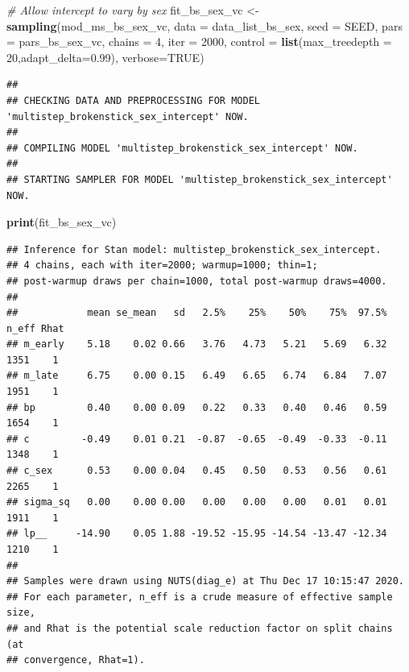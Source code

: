 \documentclass[
]{article}
\newenvironment{Shaded}{\begin{snugshade}}{\end{snugshade}}
\newcommand{\CommentTok}[1]{\textcolor[rgb]{0.56,0.35,0.01}{\textit{#1}}}
\newcommand{\DataTypeTok}[1]{\textcolor[rgb]{0.13,0.29,0.53}{#1}}
\newcommand{\DecValTok}[1]{\textcolor[rgb]{0.00,0.00,0.81}{#1}}
\newcommand{\FloatTok}[1]{\textcolor[rgb]{0.00,0.00,0.81}{#1}}
\newcommand{\KeywordTok}[1]{\textcolor[rgb]{0.13,0.29,0.53}{\textbf{#1}}}
\newcommand{\NormalTok}[1]{#1}
\newcommand{\OtherTok}[1]{\textcolor[rgb]{0.56,0.35,0.01}{#1}}
\newcommand{\StringTok}[1]{\textcolor[rgb]{0.31,0.60,0.02}{#1}}
\begin{document}
\begin{Shaded}
\begin{Highlighting}[]
\CommentTok{# Allow intercept to vary by sex}
\NormalTok{fit_bs_sex_vc <-}\StringTok{ }\KeywordTok{sampling}\NormalTok{(mod_ms_bs_sex_vc, }\DataTypeTok{data =}\NormalTok{ data_list_bs_sex, }
                  \DataTypeTok{seed =}\NormalTok{ SEED,}
                  \DataTypeTok{pars =}\NormalTok{ pars_bs_sex_vc, }\DataTypeTok{chains =} \DecValTok{4}\NormalTok{, }\DataTypeTok{iter =} \DecValTok{2000}\NormalTok{,}
                  \DataTypeTok{control =} \KeywordTok{list}\NormalTok{(}\DataTypeTok{max_treedepth =} \DecValTok{20}\NormalTok{,}\DataTypeTok{adapt_delta=}\FloatTok{0.99}\NormalTok{),}
                  \DataTypeTok{verbose=}\OtherTok{TRUE}\NormalTok{)}
\end{Highlighting}
\end{Shaded}

\begin{verbatim}
## 
## CHECKING DATA AND PREPROCESSING FOR MODEL 'multistep_brokenstick_sex_intercept' NOW.
## 
## COMPILING MODEL 'multistep_brokenstick_sex_intercept' NOW.
## 
## STARTING SAMPLER FOR MODEL 'multistep_brokenstick_sex_intercept' NOW.
\end{verbatim}

\begin{Shaded}
\begin{Highlighting}[]
\KeywordTok{print}\NormalTok{(fit_bs_sex_vc)}
\end{Highlighting}
\end{Shaded}

\begin{verbatim}
## Inference for Stan model: multistep_brokenstick_sex_intercept.
## 4 chains, each with iter=2000; warmup=1000; thin=1; 
## post-warmup draws per chain=1000, total post-warmup draws=4000.
## 
##            mean se_mean   sd   2.5%    25%    50%    75%  97.5% n_eff Rhat
## m_early    5.18    0.02 0.66   3.76   4.73   5.21   5.69   6.32  1351    1
## m_late     6.75    0.00 0.15   6.49   6.65   6.74   6.84   7.07  1951    1
## bp         0.40    0.00 0.09   0.22   0.33   0.40   0.46   0.59  1654    1
## c         -0.49    0.01 0.21  -0.87  -0.65  -0.49  -0.33  -0.11  1348    1
## c_sex      0.53    0.00 0.04   0.45   0.50   0.53   0.56   0.61  2265    1
## sigma_sq   0.00    0.00 0.00   0.00   0.00   0.00   0.01   0.01  1911    1
## lp__     -14.90    0.05 1.88 -19.52 -15.95 -14.54 -13.47 -12.34  1210    1
## 
## Samples were drawn using NUTS(diag_e) at Thu Dec 17 10:15:47 2020.
## For each parameter, n_eff is a crude measure of effective sample size,
## and Rhat is the potential scale reduction factor on split chains (at 
## convergence, Rhat=1).
\end{verbatim}
\end{document}
